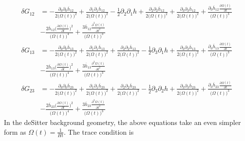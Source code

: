 \documentclass[10pt,letterpaper]{article}
\begin{document}
\begin{align}
	\delta G_{12} &=- \frac{\partial_{0}\partial_{0}\overline{h}_{12}}{2 \bigl(\Omega(t)\bigr)^2} + \frac{\partial_{1}\partial_{1}\overline{h}_{12}}{2 \bigl(\Omega(t)\bigr)^2} -  \tfrac{1}{2} \partial_{2}\partial_{1}h + \frac{\partial_{2}\partial_{2}\overline{h}_{12}}{2 \bigl(\Omega(t)\bigr)^2} + \frac{\partial_{3}\partial_{3}\overline{h}_{12}}{2 \bigl(\Omega(t)\bigr)^2} + \frac{\partial_{0}\overline{h}_{12} \frac{\partial \Omega(t)}{\partial t}}{\bigl(\Omega(t)\bigr)^3} \\
&-  \frac{2 \overline{h}_{12} \bigl(\frac{\partial \Omega(t)}{\partial t}\bigr)^2}{\bigl(\Omega(t)\bigr)^4} + \frac{3 \overline{h}_{12} \frac{\partial^{2}\Omega(t)}{\partial t^{2}}}{\bigl(\Omega(t)\bigr)^3}
\end{align}
\begin{align}
	\delta G_{13} &=- \frac{\partial_{0}\partial_{0}\overline{h}_{13}}{2 \bigl(\Omega(t)\bigr)^2} + \frac{\partial_{1}\partial_{1}\overline{h}_{13}}{2 \bigl(\Omega(t)\bigr)^2} + \frac{\partial_{2}\partial_{2}\overline{h}_{13}}{2 \bigl(\Omega(t)\bigr)^2} -  \tfrac{1}{2} \partial_{3}\partial_{1}h + \frac{\partial_{3}\partial_{3}\overline{h}_{13}}{2 \bigl(\Omega(t)\bigr)^2} + \frac{\partial_{0}\overline{h}_{13} \frac{\partial \Omega(t)}{\partial t}}{\bigl(\Omega(t)\bigr)^3} \\
&-  \frac{2 \overline{h}_{13} \bigl(\frac{\partial \Omega(t)}{\partial t}\bigr)^2}{\bigl(\Omega(t)\bigr)^4} + \frac{3 \overline{h}_{13} \frac{\partial^{2}\Omega(t)}{\partial t^{2}}}{\bigl(\Omega(t)\bigr)^3}
\end{align}
\begin{align}
	\delta G_{23} &= - \frac{\partial_{0}\partial_{0}\overline{h}_{23}}{2 \bigl(\Omega(t)\bigr)^2} + \frac{\partial_{1}\partial_{1}\overline{h}_{23}}{2 \bigl(\Omega(t)\bigr)^2} + \frac{\partial_{2}\partial_{2}\overline{h}_{23}}{2 \bigl(\Omega(t)\bigr)^2} -  \tfrac{1}{2} \partial_{3}\partial_{2}h + \frac{\partial_{3}\partial_{3}\overline{h}_{23}}{2 \bigl(\Omega(t)\bigr)^2} + \frac{\partial_{0}\overline{h}_{23} \frac{\partial \Omega(t)}{\partial t}}{\bigl(\Omega(t)\bigr)^3}\\
& -  \frac{2 \overline{h}_{23} \bigl(\frac{\partial \Omega(t)}{\partial t}\bigr)^2}{\bigl(\Omega(t)\bigr)^4} + \frac{3 \overline{h}_{23} \frac{\partial^{2}\Omega(t)}{\partial t^{2}}}{\bigl(\Omega(t)\bigr)^3}
\end{align}
In the deSitter background geometry, the above equations take an even simpler form as $\Omega(t) = \frac{1}{Ht}$. The trace condition is
\end{document}
